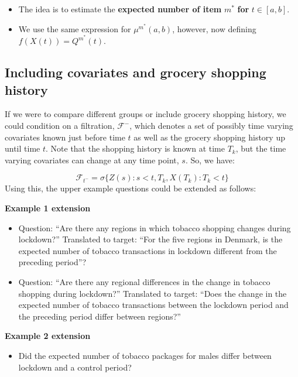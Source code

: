 \documentclass[
  11pt,
]{article}
\providecommand{\tightlist}{%
  \setlength{\itemsep}{0pt}\setlength{\parskip}{0pt}}
\begin{document}
\begin{itemize}
\tightlist
\item
  The idea is to estimate the \textbf{expected number of item} \(m^*\)
  \textbf{for} \(t\in[a,b]\).
\item
  We use the same expression for \(\mu^{m^*}(a,b)\), however, now
  defining \(f(X(t)) = Q^{m^*}(t)\).
\end{itemize}

\hypertarget{including-covariates-and-grocery-shopping-history}{%
\subsection{Including covariates and grocery shopping
history}\label{including-covariates-and-grocery-shopping-history}}

If we were to compare different groups or include grocery shopping
history, we could condition on a filtration, \(\mathcal{F}^-\), which
denotes a set of possibly time varying covariates known just before time
\(t\) as well as the grocery shopping history up until time \(t\). Note
that the shopping history is known at time \(T_k\), but the time varying
covariates can change at any time point, \(s\). So, we have:

\[
\mathcal{F}_{t^-} = \sigma\{Z(s): s < t, T_k, X(T_k): T_k < t\}
\] Using this, the upper example questions could be extended as follows:

\textbf{Example 1 extension}

\begin{itemize}
\tightlist
\item
  Question: ``Are there any regions in which tobacco shopping changes
  during lockdown?'' Translated to target: ``For the five regions in
  Denmark, is the expected number of tobacco transactions in lockdown
  different from the preceding period''?
\item
  Question: ``Are there any regional differences in the change in
  tobacco shopping during lockdown?'' Translated to target: ``Does the
  change in the expected number of tobacco transactions between the
  lockdown period and the preceding period differ between regions?''
\end{itemize}

\textbf{Example 2 extension}

\begin{itemize}
\tightlist
\item
  Did the expected number of tobacco packages for males differ between
  lockdown and a control period?
\end{itemize}
\end{document}
